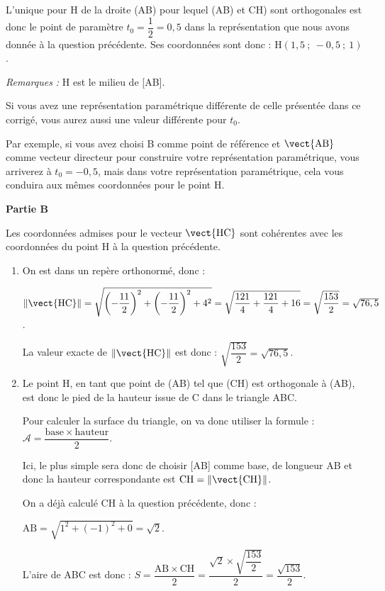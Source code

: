 \begin{enumerate}
L'unique pour H de la droite (AB) pour lequel (AB) et CH) sont orthogonales est donc le point de paramètre $t_0 = \dfrac{1}{2}=0,5$ dans la représentation que nous avons donnée à la question précédente. Ses coordonnées sont donc : H$(1,5 ~;~ -0,5 ~;~ 1)$.

\emph{Remarques :} H est le milieu de [AB].

Si vous avez une représentation paramétrique différente de celle présentée dans ce corrigé, vous aurez aussi une valeur différente pour $t_0$.

Par exemple, si vous avez choisi B comme point de référence et $\vect{\mathrm{AB}}$ comme vecteur directeur pour construire votre représentation paramétrique, vous arriverez à $t_0 = -0,5$, mais dans votre représentation paramétrique, cela vous conduira aux mêmes coordonnées pour le point H.
\end{enumerate}

\medskip

\textbf{Partie B}

\medskip
Les coordonnées admises pour le vecteur $\vect{\mathrm{HC}}$ sont cohérentes avec les coordonnées du point H à la question précédente.

\begin{enumerate}
	\item On est dans un repère orthonormé, donc :

	$\left\|\vect{\mathrm{HC}}\right\| = \sqrt{\left(-\dfrac{11}{2}\right)^2+\left(-\dfrac{11}{2}\right)^2+4^2 } = \sqrt{\dfrac{121}{4}+\dfrac{121}{4}+16} = \sqrt{\dfrac{153}{2}} = \sqrt{76,5}$.

	La valeur exacte de $\left\|\vect{\mathrm{HC}}\right\| $ est donc : $\sqrt{\dfrac{153}{2}} = \sqrt{76,5}$.

	\item Le point H, en tant que point de (AB) tel que (CH) est orthogonale à (AB), est donc le pied de la hauteur issue de C dans le triangle ABC.

Pour calculer la surface du triangle, on va donc utiliser la formule :\quad$\mathcal{A} = \dfrac{\mathrm{base}\times \mathrm{hauteur}}{2}$.

Ici, le plus simple sera donc de choisir [AB] comme base, de longueur AB et donc la hauteur correspondante est $\mathrm{CH} = \left\|\vect{\mathrm{CH}}\right\| $.

On a déjà calculé CH à la question précédente, donc :

$\mathrm{AB} = \sqrt{1^2 + (-1)^2 + 0} = \sqrt{2}$.

L'aire de ABC est donc : \quad$ S = \dfrac{\mathrm{AB}\times \mathrm{CH}}{2} = \dfrac{\sqrt{2} \times \sqrt{\dfrac{153}{2}}}{2} = \dfrac{\sqrt{153}}{2}$.
\end{enumerate}

